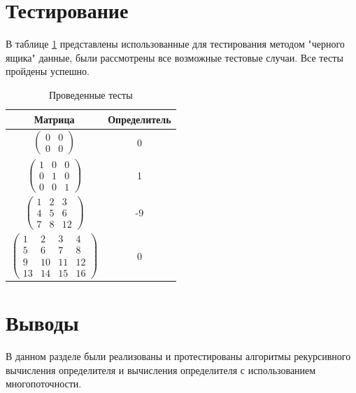 \documentclass[a4paper,oneside,14pt]{extreport}
\begin{document}
\section{Тестирование}
В таблице \ref{tab:tests} представлены использованные для тестирования методом "черного ящика" данные, были рассмотрены все возможные тестовые случаи. Все тесты пройдены успешно.

\begin{table}[H]
	\begin{center}
		\captionsetup{justification=raggedleft, singlelinecheck=false}
		\caption[]{\label{tab:tests} Проведенные тесты}

	\begin{tabular}{|c|c|}
		\hline
		\rule[-1ex]{0pt}{2.5ex} Матрица & Определитель \\
		\hline
		\rule[-1ex]{0pt}{2.5ex} $\begin{pmatrix}
			0 & 0 \\
			0 & 0
		\end{pmatrix}$ & 0
		\\
		\hline
		\rule[-1ex]{0pt}{2.5ex} $\begin{pmatrix}
			1 & 0 & 0 \\
			0 & 1 & 0 \\
			0 & 0 & 1
		\end{pmatrix}$ & 1
		 \\
		\hline
		\rule[-1ex]{0pt}{2.5ex}	$\begin{pmatrix}
			1 & 2 & 3 \\
			4 & 5 & 6 \\
			7 & 8 & 12
		\end{pmatrix}$ & -9
		\\
		\hline
		\rule[-1ex]{0pt}{2.5ex} $\begin{pmatrix}
			1 & 2 & 3 & 4 \\
			5 & 6 & 7 & 8 \\
			9 & 10 & 11 & 12 \\
			13 & 14 & 15 & 16
		\end{pmatrix}$ & 0
		 \\
		 \hline
	\end{tabular}
\end{center}
\end{table}
\section{Выводы}
В данном разделе были реализованы и протестированы алгоритмы рекурсивного вычисления определителя и вычисления определителя с использованием многопоточности.
\newpage
\end{document}
